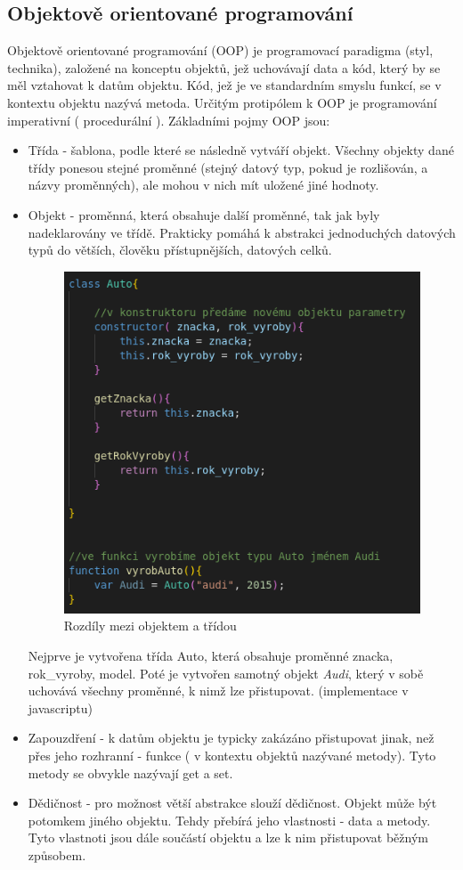 \documentclass[main.tex]{subfiles}
\begin{document}
\subsection{Objektově orientované programování}
\label{oop}
Objektově orientované programování (OOP) je programovací paradigma (styl, technika), založené na konceptu objektů, jež uchovávají data a kód, který by se měl vztahovat k datům objektu. Kód, jež je ve standardním smyslu funkcí, se v kontextu objektu nazývá metoda. Určitým protipólem k OOP je programování imperativní ( procedurální ). Základními pojmy OOP jsou:
\begin{itemize}
    \item Třída - šablona, podle které se následně vytváří objekt. Všechny objekty dané třídy ponesou stejné proměnné (stejný datový typ, pokud je rozlišován, a názvy proměnných), ale mohou v nich mít uložené jiné hodnoty. 
	\item Objekt - proměnná, která obsahuje další proměnné, tak jak byly nadeklarovány ve třídě. Prakticky pomáhá k abstrakci jednoduchých datových typů do větších, člověku přístupnějších, datových celků.
		\begin{figure}[h]
			\centering
			\includegraphics[width=.6\textwidth]{./images/oop/class_audi.png}
			\caption{Rozdíly mezi objektem a třídou}
		\end{figure}
		Nejprve je vytvořena třída Auto, která obsahuje proměnné znacka, rok\_vyroby, model. Poté je vytvořen samotný objekt \textit{Audi}, který v sobě uchovává všechny proměnné, k nimž lze přistupovat. (implementace v javascriptu)
    \item Zapouzdření - k datům objektu je typicky zakázáno přistupovat jinak, než přes jeho rozhranní - funkce ( v kontextu objektů nazývané metody). Tyto metody se obvykle nazývají get a set.
	\item Dědičnost - pro možnost větší abstrakce slouží dědičnost. Objekt může být potomkem jiného objektu. Tehdy přebírá jeho vlastnosti - data a metody. Tyto vlastnoti jsou dále součástí objektu a lze k nim přistupovat běžným způsobem.

\end{itemize}
\end{document}
